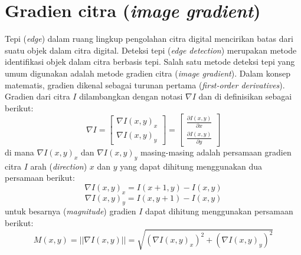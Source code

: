 \section{Gradien citra (\emph{image gradient})}
Tepi (\emph{edge}) dalam ruang lingkup pengolahan citra digital mencirikan batas dari suatu objek dalam citra digital. Deteksi tepi (\emph{edge detection}) merupakan metode identifikasi objek dalam citra berbasis tepi. Salah satu metode deteksi tepi yang umum digunakan adalah metode gradien citra (\emph{image gradient}). Dalam konsep matematis, gradien dikenal sebagai turunan pertama (\emph{first-order derivatives}). Gradien dari citra $I$ dilambangkan dengan notasi $\nabla I$ dan di definisikan sebagai berikut:
\begin{equation}
	\label{gradientimagedefinition}
	{
		\nabla I =
	}
	{
		\begin{bmatrix}
			\nabla I (x,y)_x	\\
			\nabla I (x,y)_y
		\end{bmatrix}
	}
	{
		=
	}
	{
		\begin{bmatrix}
			\frac{\partial I (x,y)}{\partial x}	\\
			\frac{\partial I (x,y)}{\partial y}
		\end{bmatrix}
	}
\end{equation}
di mana $\nabla I (x,y)_x$ dan $\nabla I (x,y)_y$ masing-masing adalah persamaan gradien citra $I$ arah (\emph{direction}) $x$ dan $y$ yang dapat dihitung menggunakan dua persamaan berikut:
\begin{equation}
	\label{gradient_fd1}
	\nabla I (x,y)_x = I(x+1 , y) - I(x,y)
\end{equation}
\begin{equation}
	\label{gradient_fd2}
	\nabla I (x,y)_y = I(x , y + 1) - I(x,y)
\end{equation}
untuk besarnya (\emph{magnitude}) gradien $I$ dapat dihitung menggunakan persamaan berikut:
\begin{equation}
	\label{magnitudegradientfd}
	M(x,y) = ||\nabla I(x,y)|| = \sqrt{ (\nabla I (x,y)_x)^2 + (\nabla I (x,y)_y)^2 }
\end{equation}

